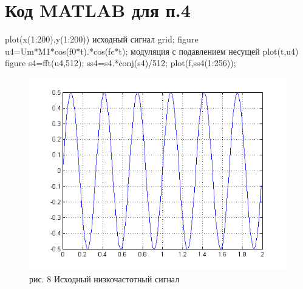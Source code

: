 \documentclass[10pt,a4paper]{report}
\begin{document}
\chapter{Код MATLAB для п.4}
 plot(x(1:200),y(1:200)) исходный сигнал\newline
grid;\newline
figure\newline
u4=Um*M1*cos(f0*t).*cos(fc*t); модуляция с подавлением несущей\newline
plot(t,u4) \newline
figure\newline
s4=fft(u4,512);\newline
ss4=s4.*conj(s4)/512;\newline
plot(f,ss4(1:256));
\begin{figure}
\begin{center}
\includegraphics[angle=0, scale = 0.8]{1_1.png}\newline
рис. 8  Исходный низкочастотный сигнал\newline
\end{center}
\end{figure}
\end{document}
